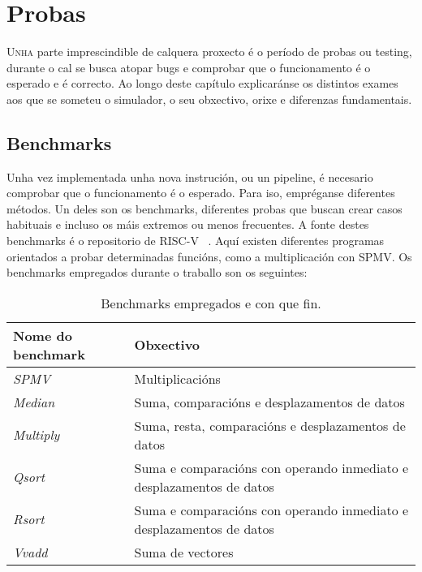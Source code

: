 \chapter{Probas}
\label{chap:probas}

\lettrine{U}{nha} parte imprescindible de calquera proxecto é o período de probas ou testing, durante o cal se busca atopar bugs e comprobar que o funcionamento é o esperado e é correcto. Ao longo deste capítulo explicaránse os distintos exames aos que se someteu o simulador, o seu obxectivo, orixe e diferenzas fundamentais.

\section{Benchmarks}\label{sec:benchmarks}
Unha vez implementada unha nova instrución, ou un pipeline, é necesario comprobar que o funcionamento é o esperado. Para iso, empréganse diferentes métodos. Un deles son os benchmarks, diferentes probas que buscan crear casos habituais e incluso os máis extremos ou menos frecuentes. A fonte destes benchmarks é o repositorio de RISC-V ~\cite{riscv_tests}. Aquí existen diferentes programas orientados a probar determinadas funcións, como a multiplicación con SPMV. Os benchmarks empregados durante o traballo son os seguintes:
\begin{table}[hp!]
  \centering
  \begin{tabular}{p{5cm}|p{8cm}}
    \rowcolor{udcpink!25}
    \textbf{Nome do benchmark} & \textbf{Obxectivo} \\\hline
    \textit{SPMV} & Multiplicacións \\
    \textit{Median} & Suma, comparacións e desplazamentos de datos \\
    \textit{Multiply} & Suma, resta, comparacións e desplazamentos de datos \\
    \textit{Qsort} & Suma e comparacións con operando inmediato e desplazamentos de datos \\
    \textit{Rsort} & Suma e comparacións con operando inmediato e desplazamentos de datos \\
    \textit{Vvadd} & Suma de vectores\\
  \end{tabular}
  \caption{Benchmarks empregados e con que fin.}
  \label{tab:benchmarks}
\end{table}

